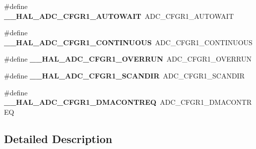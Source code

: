 \begin{DoxyCompactItemize}
\mbox{\label{group___h_a_l___a_d_c___aliased___macros_ga400e3c69f55dad73669df7ce10297066}} 
\#define {\bfseries \+\_\+\+\_\+\+H\+A\+L\+\_\+\+A\+D\+C\+\_\+\+C\+F\+G\+R1\+\_\+\+A\+U\+T\+O\+W\+A\+IT}~A\+D\+C\+\_\+\+C\+F\+G\+R1\+\_\+\+A\+U\+T\+O\+W\+A\+IT
\item 
\mbox{\label{group___h_a_l___a_d_c___aliased___macros_ga6e3bc5992840ed200085c9b3ba68d7d2}} 
\#define {\bfseries \+\_\+\+\_\+\+H\+A\+L\+\_\+\+A\+D\+C\+\_\+\+C\+F\+G\+R1\+\_\+\+C\+O\+N\+T\+I\+N\+U\+O\+US}~A\+D\+C\+\_\+\+C\+F\+G\+R1\+\_\+\+C\+O\+N\+T\+I\+N\+U\+O\+US
\item 
\mbox{\label{group___h_a_l___a_d_c___aliased___macros_ga60d5ad7e386833338f43e293120fd20a}} 
\#define {\bfseries \+\_\+\+\_\+\+H\+A\+L\+\_\+\+A\+D\+C\+\_\+\+C\+F\+G\+R1\+\_\+\+O\+V\+E\+R\+R\+UN}~A\+D\+C\+\_\+\+C\+F\+G\+R1\+\_\+\+O\+V\+E\+R\+R\+UN
\item 
\mbox{\label{group___h_a_l___a_d_c___aliased___macros_gacadf737dca92c21560405c914f98ab06}} 
\#define {\bfseries \+\_\+\+\_\+\+H\+A\+L\+\_\+\+A\+D\+C\+\_\+\+C\+F\+G\+R1\+\_\+\+S\+C\+A\+N\+D\+IR}~A\+D\+C\+\_\+\+C\+F\+G\+R1\+\_\+\+S\+C\+A\+N\+D\+IR
\item 
\mbox{\label{group___h_a_l___a_d_c___aliased___macros_gad36423da25741a685c5aefd3cd0d08ee}} 
\#define {\bfseries \+\_\+\+\_\+\+H\+A\+L\+\_\+\+A\+D\+C\+\_\+\+C\+F\+G\+R1\+\_\+\+D\+M\+A\+C\+O\+N\+T\+R\+EQ}~A\+D\+C\+\_\+\+C\+F\+G\+R1\+\_\+\+D\+M\+A\+C\+O\+N\+T\+R\+EQ
\end{DoxyCompactItemize}


\subsection{Detailed Description}
